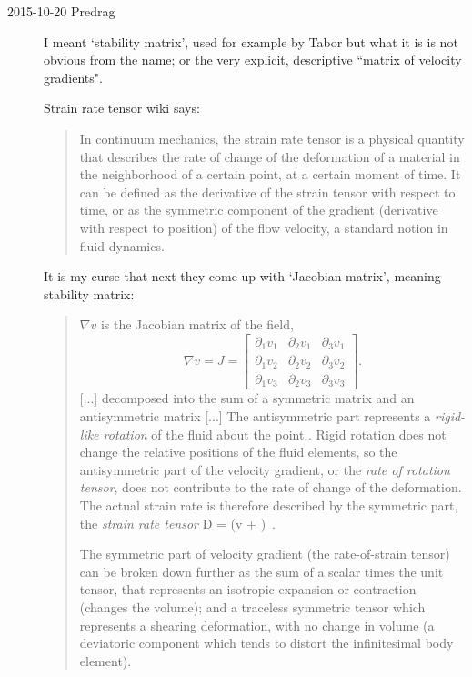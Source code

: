 \begin{description}
\item[2015-10-20 Predrag]                 \toCB
I meant `stability matrix', used for example by Tabor but
what it is is not obvious from the name; or the very explicit,
descriptive ``matrix of velocity gradients".

{Strain rate tensor wiki} says:

\begin{quote}
In continuum mechanics, the strain rate tensor is a physical quantity
that describes the rate of change of the deformation of a material in the
neighborhood of a certain point, at a certain moment of time. It can be
defined as the derivative of the strain tensor with respect to time, or
as the symmetric component of the gradient (derivative with respect to
position) of the flow velocity, a standard notion in fluid dynamics.
\end{quote}
It is my curse that next they come up with `Jacobian matrix', meaning
stability matrix:
\begin{quote}

$\nabla v$ is the Jacobian matrix of the field,
\[
    \nabla v = J =
    \begin{bmatrix} \displaystyle{\partial_1 v_1}
                     & \displaystyle{\partial_2 v_1}
                       & \displaystyle{\partial_3 v_1}\\
                    \displaystyle{\partial_1 v_2}
                      & \displaystyle{\partial_2 v_2}
                        & \displaystyle{\partial_3 v_2}\\
                    \displaystyle{\partial_1 v_3}
                      & \displaystyle{\partial_2 v_3}
                         & \displaystyle{\partial_3 v_3}
    \end{bmatrix}.
\]
[...]  decomposed into the sum of a symmetric matrix and an antisymmetric
matrix [...]
The antisymmetric part represents a \emph{rigid-like rotation} of the
fluid about the point \ssp. Rigid rotation does not change the relative
positions of the fluid elements, so the antisymmetric part of the
velocity gradient, or the \emph{rate of rotation tensor},  does not
contribute to the rate of change of the deformation. The actual strain
rate is therefore described by the symmetric part, the \emph{strain rate
tensor}
\beq
D = \left(\nabla \cdot v + \right)
\,.

The symmetric part of velocity gradient (the rate-of-strain tensor) can
be broken down further as the sum of a scalar times the unit tensor, that
represents an isotropic expansion or contraction (changes the volume);
and a traceless symmetric tensor which represents a shearing deformation,
with no change in volume (a deviatoric component which tends to distort
the infinitesimal body element).


\end{quote}
\end{description}
